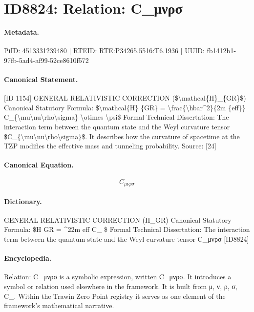 \section*{ID8824: Relation: C\_μνρσ}
\paragraph{Metadata.}
PiID: 4513331239480 | RTEID: RTE:P34265.5516:T6.1936 | UUID: fb1412b1-97fb-5ad4-af99-52ce8610f572

\paragraph{Canonical Statement.}
[ID 1154] GENERAL RELATIVISTIC CORRECTION (\$\textbackslash{}mathcal\{H\}\_\{GR\}\$) Canonical Statutory Formula: \$\textbackslash{}mathcal\{H\} \{GR\} = \textbackslash{}frac\{\textbackslash{}hbar\textasciicircum{}2\}\{2m \{eff\}\} C\_\{\textbackslash{}mu\textbackslash{}nu\textbackslash{}rho\textbackslash{}sigma\} \textbackslash{}otimes \textbackslash{}psi\$ Formal Technical Dissertation: The interaction term between the quantum state and the Weyl curvature tensor \$C\_\{\textbackslash{}mu\textbackslash{}nu\textbackslash{}rho\textbackslash{}sigma\}\$. It describes how the curvature of spacetime at the TZP modifies the effective mass and tunneling probability. Source: [24]

\paragraph{Canonical Equation.}
\[
C_{\mu\nu\rho\sigma}
\]

\paragraph{Dictionary.}
GENERAL RELATIVISTIC CORRECTION (H\_GR) Canonical Statutory Formula: \$H GR = \textasciicircum{}22m eff C\_ \$ Formal Technical Dissertation: The interaction term between the quantum state and the Weyl curvature tensor C\_μνρσ [ID8824]

\paragraph{Encyclopedia.}
Relation: C\_μνρσ is a symbolic expression, written C\_μνρσ. It introduces a symbol or relation used elsewhere in the framework. It is built from μ, ν, ρ, σ, C\_. Within the Trawin Zero Point registry it serves as one element of the framework's mathematical narrative.

